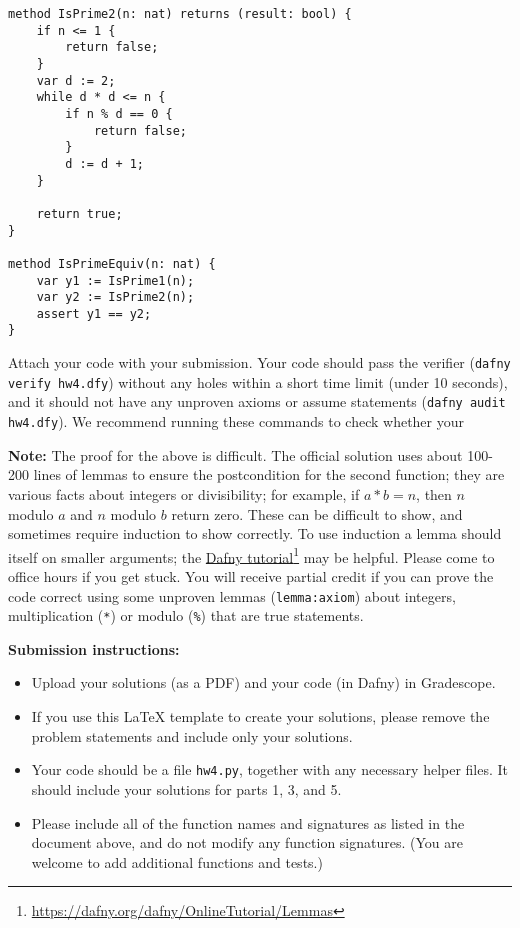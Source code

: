 \documentclass{article}
\newcommand{\visiblehref}[2]{\href{#1}{#2}\footnote{\url{#1}}}
\begin{document}
\begin{enumerate}
\begin{verbatim}
method IsPrime2(n: nat) returns (result: bool) {
    if n <= 1 {
        return false;
    }
    var d := 2;
    while d * d <= n {
        if n % d == 0 {
            return false;
        }
        d := d + 1;
    }

    return true;
}

method IsPrimeEquiv(n: nat) {
    var y1 := IsPrime1(n);
    var y2 := IsPrime2(n);
    assert y1 == y2;
}
\end{verbatim}

Attach your code with your submission.
Your code should pass the verifier (\texttt{dafny verify hw4.dfy}) without any holes
within a short time limit (under 10 seconds),
and it should not have any unproven axioms or assume statements (\texttt{dafny audit hw4.dfy}).
We recommend running these commands to check whether your

\textbf{Note:}
The proof for the above is difficult.
The official solution uses about 100-200 lines of lemmas
to ensure the postcondition for the second function;
they are various facts about integers or divisibility;
for example, if $a * b = n$, then $n$ modulo $a$ and $n$ modulo $b$ return zero.
These can be difficult to show, and sometimes require induction to show correctly.
To use induction a lemma should itself on smaller arguments; the \visiblehref{https://dafny.org/dafny/OnlineTutorial/Lemmas}{Dafny tutorial} may be helpful.
Please come to office hours if you get stuck.
You will receive partial credit if you can prove the code correct using some unproven lemmas (\texttt{lemma{:axiom}}) about integers, multiplication (\texttt{*}) or modulo (\texttt{\%}) that are true statements.

\end{enumerate}

\noindent
\textbf{Submission instructions:}
\begin{itemize}
\item Upload your solutions (as a PDF) and your code (in Dafny) in Gradescope.
\item If you use this LaTeX template to create your solutions, please remove the problem statements
and include only your solutions.
\item Your code should be a file \texttt{hw4.py}, together with any necessary helper files.
It should include your solutions for parts 1, 3, and 5.
\item Please include all of the function names and signatures as listed in the document above,
and do not modify any function signatures. (You are welcome to add additional functions and tests.)
\end{itemize}
\end{document}
